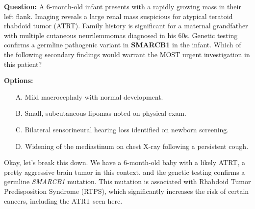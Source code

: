 \documentclass{article}
\theoremstyle{plain}
\theoremstyle{definition}
\theoremstyle{remark}
\begin{document}
\begin{tcolorbox}[
    colframe=medicalblue,
    colback=white,
    title={\textbf{Detailed Compositional Reasoning | Category: Neoplasms | Difficulty: 1 | Num Hops: 3}},
    colbacktitle=medicalblue,
    fonttitle=\sffamily\bfseries,
    sharp corners,
    boxrule=1pt,
    enhanced,
    breakable,
    attach boxed title to top left={yshift=-2mm, xshift=2mm},
    boxed title style={sharp corners, colframe=medicalblue}
]
    \small
    \textbf{Question:} 
    A 6-month-old infant presents with a rapidly growing mass in their left flank. Imaging reveals a large renal mass suspicious for atypical teratoid rhabdoid tumor (ATRT). Family history is significant for a maternal grandfather with multiple cutaneous neurilemmomas diagnosed in his 60s. Genetic testing confirms a germline pathogenic variant in \textbf{SMARCB1} in the infant. Which of the following secondary findings would warrant the MOST urgent investigation in this patient?

    \vspace{0.2cm}
    \textbf{Options:}
    \begin{itemize}[leftmargin=*, nosep]
        \item[A.] Mild macrocephaly with normal development.
        \item[B.] Small, subcutaneous lipomas noted on physical exam.
        \item[C.] Bilateral sensorineural hearing loss identified on newborn screening.
        \item[D.] Widening of the mediastinum on chest X-ray following a persistent cough.
    \end{itemize}

    \vspace{0.4cm}
    \begin{tcolorbox}[
        colback=thoughtback,
        colframe=medicalblue!30,
        title=Step-by-Step Reasoning ($<think>$),
        fonttitle=\small\sffamily\bfseries,
        coltitle=medicalblue,
        boxrule=0.5pt,
        left=2mm, right=2mm, top=1mm, bottom=1mm
    ]
        \footnotesize
        Okay, let's break this down. We have a 6-month-old baby with a likely ATRT, a pretty aggressive brain tumor in this context, and the genetic testing confirms a germline \textit{SMARCB1} mutation. This mutation is associated with \colorbox{pathhighlight}{Rhabdoid Tumor Predisposition Syndrome (RTPS),} which significantly increases the risk of certain cancers, including the ATRT seen here.


\end{tcolorbox}
\end{tcolorbox}
\end{document}
